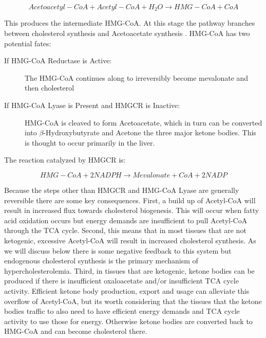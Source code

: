 \documentclass{tufte-handout}
\begin{document}
\begin{equation}\label{eq:hmgcs}
Acetoacetyl-CoA + Acetyl-CoA + H_2O \rightarrow HMG-CoA + CoA
\end{equation}

This produces the intermediate HMG-CoA.  At this stage the pathway branches between cholesterol synthesis and Acetoacetate synthesis .  HMG-CoA has two potential fates:
\begin{description}
\item [If HMG-CoA Reductase is Active:] The HMG-CoA continues along to irreversibly become mevalonate and then cholesterol
\item [If HMG-CoA Lyase is Present and HMGCR is Inactive:] HMG-CoA is cleaved to form Acetoacetate, which in turn can be converted into $\beta$-Hydroxybutyrate and Acetone the three major ketone bodies.  This is thought to occur primarily in the liver.
\end{description}

The reaction catalyzed by HMGCR is:

\begin{equation}\label{eq:hmgcs}
HMG-CoA + 2NADPH \rightarrow Mevalonate + CoA + 2NADP
\end{equation}

 Because the steps other than HMGCR and HMG-CoA Lyase are generally reversible there are some key consequences.  First, a build up of Acetyl-CoA will result in increased flux towards cholesterol biogenesis.  This will occur when fatty acid oxidation occurs but energy demands are insufficient to pull Acetyl-CoA through the TCA cycle.  Second, this means that in most tissues that are not ketogenic, excessive Acetyl-CoA will result in increased cholesterol synthesis.  As we will discuss below there is some negative feedback to this system but endogenous cholesterol synthesis is the primary mechanism of hypercholesterolemia.  Third, in tissues that are ketogenic, ketone bodies can be produced if there is insufficient oxaloacetate and/or insufficient TCA cycle activity.  Efficient ketone body production, export and usage can alleviate this overflow of Acetyl-CoA, but its worth considering that the tissues that the ketone bodies traffic to also need to have efficient energy demands and TCA cycle activity to use those for energy.  Otherwise ketone bodies are converted back to HMG-CoA and can become cholesterol there.
\end{document}
